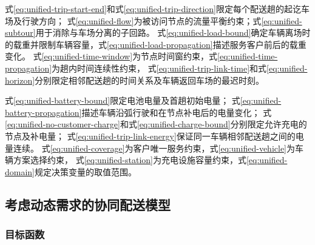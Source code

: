 式\eqref{eq:unified-trip-start-end}和式\eqref{eq:unified-trip-direction}限定每个配送趟的起讫车场及行驶方向；
式\eqref{eq:unified-flow}为被访问节点的流量平衡约束；式\eqref{eq:unified-subtour}用于消除与车场分离的子回路。
式\eqref{eq:unified-load-bound}确定车辆离场时的载重并限制车辆容量，式\eqref{eq:unified-load-propagation}描述服务客户前后的载重变化。
式\eqref{eq:unified-time-window}为节点时间窗约束，式\eqref{eq:unified-time-propagation}为趟内时间连续性约束，
式\eqref{eq:unified-trip-link-time}和式\eqref{eq:unified-horizon}分别限定相邻配送趟的时间关系及车辆返回车场的最迟时刻。

式\eqref{eq:unified-battery-bound}限定电池电量及首趟初始电量；
式\eqref{eq:unified-battery-propagation}描述车辆沿弧行驶和在节点补电后的电量变化；
式\eqref{eq:unified-no-customer-charge}和式\eqref{eq:unified-charge-bound}分别限定允许充电的节点及补电量；
式\eqref{eq:unified-trip-link-energy}保证同一车辆相邻配送趟之间的电量连续。
式\eqref{eq:unified-coverage}为客户唯一服务约束，式\eqref{eq:unified-vehicle}为车辆方案选择约束，
式\eqref{eq:unified-station}为充电设施容量约束，式\eqref{eq:unified-domain}规定决策变量的取值范围。

\subsection{考虑动态需求的协同配送模型}

\subsubsection{目标函数}

